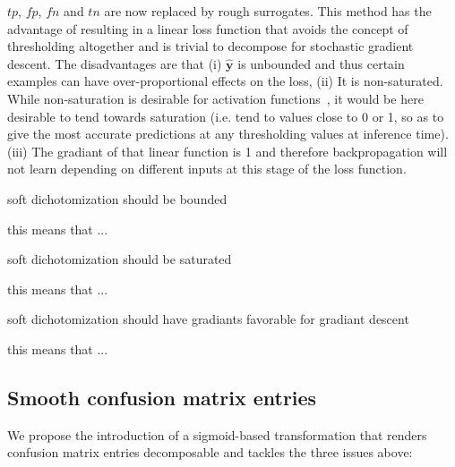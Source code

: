 
\(tp\), \(fp\), \(fn\) and \(tn\) are now replaced by rough surrogates. This method has the advantage of resulting in a linear loss function that avoids the concept of thresholding altogether and is trivial to decompose for stochastic gradient descent. The disadvantages are that (i) \(\hat{\mathbf{y}}\) is unbounded and thus certain examples can have over-proportional effects on the loss, (ii) It is non-saturated. While non-saturation is desirable for activation functions~\cite{saturation}, it would be here desirable to tend towards saturation (i.e. tend to values close to 0 or 1, so as to give the most accurate predictions at any thresholding values at inference time). (iii) The gradiant of that linear function is 1 and therefore backpropagation will not learn depending on different inputs at this stage of the loss function. 


\begin{prop}
  soft dichotomization should be bounded
\end{prop}
this means that ...

\begin{prop}
  soft dichotomization should be saturated
\end{prop}

this means that ...

\begin{prop}
  soft dichotomization should have gradiants favorable for gradiant descent
\end{prop}

this means that ...



\subsection{Smooth confusion matrix entries}

We propose the introduction of a sigmoid-based transformation that renders confusion matrix entries decomposable and tackles the three issues above:

